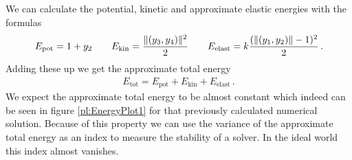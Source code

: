 \documentclass{report}
\DeclarePairedDelimiter{\norm}{\lVert}{\rVert}
\newcounter{constant}
\begin{document}
We can calculate the potential, kinetic and approximate elastic energies with the formulas
\begin{align*}
	E_{\text{pot}}=1+y_2
	\qquad E_{\text{kin}}=\frac{\norm{(y_3,y_4)}^2}{2}
	\qquad E_{\text{elast}}=k\frac{(\norm{(y_1,y_2)}-1)^2}{2}\,.
\end{align*}
Adding these up we get the approximate total energy
\begin{align*}
	E_{\text{tot}}=E_{\text{pot}}+E_{\text{kin}}+E_{\text{elast}}\,.
\end{align*}
We expect the approximate total energy to be almost constant which indeed can be seen in figure \ref{pl:EnergyPlot1} for that previously calculated numerical solution.
Because of this property we can use the variance of the approximate total energy as an index to measure the stability of a solver. 
In the ideal world this index almost vanishes.
\end{document}
